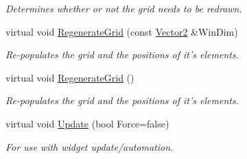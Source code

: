 \begin{DoxyCompactItemize}
\begin{DoxyCompactList}\small\item\em Determines whether or not the grid needs to be redrawn. \item\end{DoxyCompactList}\item 
\hypertarget{classphys_1_1UI_1_1CellGrid_ab426bff9fe6c637aa4438fd00cdde71b}{
virtual void \hyperlink{classphys_1_1UI_1_1CellGrid_ab426bff9fe6c637aa4438fd00cdde71b}{RegenerateGrid} (const \hyperlink{classphys_1_1Vector2}{Vector2} \&WinDim)}
\label{classphys_1_1UI_1_1CellGrid_ab426bff9fe6c637aa4438fd00cdde71b}

\begin{DoxyCompactList}\small\item\em Re-\/populates the grid and the positions of it's elements. \item\end{DoxyCompactList}\item 
\hypertarget{classphys_1_1UI_1_1CellGrid_a1fecbe653e802df38b5bb416a73efda9}{
virtual void \hyperlink{classphys_1_1UI_1_1CellGrid_a1fecbe653e802df38b5bb416a73efda9}{RegenerateGrid} ()}
\label{classphys_1_1UI_1_1CellGrid_a1fecbe653e802df38b5bb416a73efda9}

\begin{DoxyCompactList}\small\item\em Re-\/populates the grid and the positions of it's elements. \item\end{DoxyCompactList}\item 
\hypertarget{classphys_1_1UI_1_1CellGrid_ae72ca5a4a8924596df199c66e64c136f}{
virtual void \hyperlink{classphys_1_1UI_1_1CellGrid_ae72ca5a4a8924596df199c66e64c136f}{Update} (bool Force=false)}
\label{classphys_1_1UI_1_1CellGrid_ae72ca5a4a8924596df199c66e64c136f}

\begin{DoxyCompactList}\small\item\em For use with widget update/automation. \item\end{DoxyCompactList}\end{DoxyCompactItemize}
